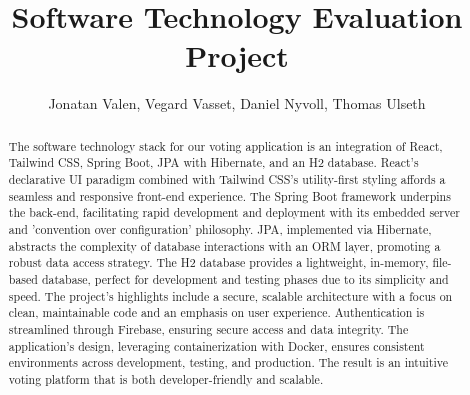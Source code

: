 \documentclass[11pt]{article}
\begin{document}
\title{Software Technology Evaluation Project}

\author{Jonatan Valen, Vegard Vasset, Daniel Nyvoll, Thomas Ulseth}

\maketitle

\begin{abstract}
The software technology stack for our voting application is an integration of React, Tailwind CSS, Spring Boot, JPA with Hibernate, and an H2 database. React's declarative UI paradigm combined with Tailwind CSS's utility-first styling affords a seamless and responsive front-end experience. The Spring Boot framework underpins the back-end, facilitating rapid development and deployment with its embedded server and 'convention over configuration' philosophy. JPA, implemented via Hibernate, abstracts the complexity of database interactions with an ORM layer, promoting a robust data access strategy. The H2 database provides a lightweight, in-memory, file-based database, perfect for development and testing phases due to its simplicity and speed. The project's highlights include a secure, scalable architecture with a focus on clean, maintainable code and an emphasis on user experience. Authentication is streamlined through Firebase, ensuring secure access and data integrity. The application's design, leveraging containerization with Docker, ensures consistent environments across development, testing, and production. The result is an intuitive voting platform that is both developer-friendly and scalable.
\end{abstract}

%














\end{document}
